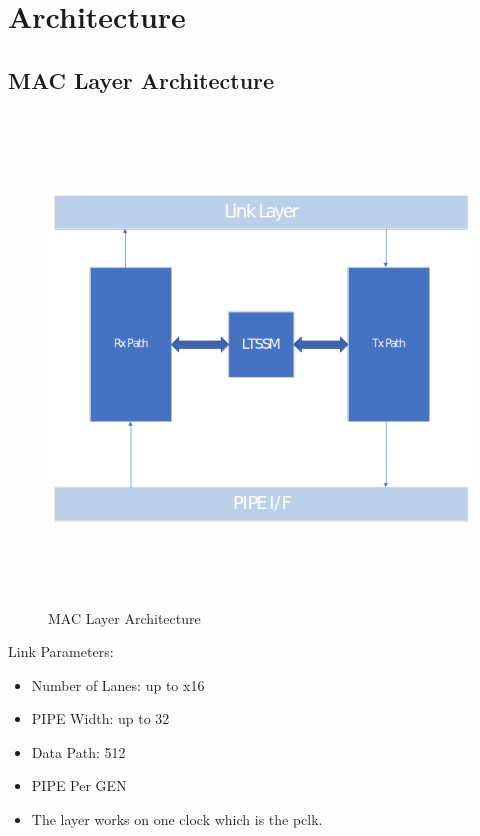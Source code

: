 \chapter{Architecture}
\label{4}
\section{MAC Layer Architecture}
\begin{figure}[H]
\centering
\includegraphics[width=130mm,height=130mm]{images/arch1.png}
\caption{MAC Layer Architecture}
\end{figure}
Link Parameters:
  \begin{itemize}
    \item Number of Lanes: up to x16
    \item PIPE Width: up to 32
    \item Data Path: 512
    \item PIPE Per GEN
    \item The layer works on one clock which is the pclk.
  \end{itemize}
